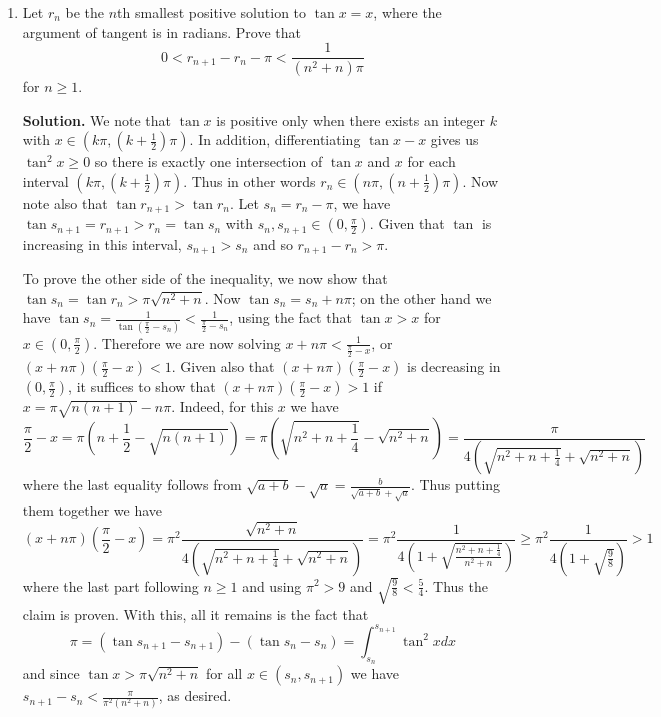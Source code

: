 \documentclass[11pt,a4paper]{article}
\begin{document}
\begin{enumerate}
    	(TODO)
    	
    	\item [B3.] 
    	Let $r_n$ be the $n$th smallest positive solution to $\tan x=x$, where the argument of tangent is in radians. Prove that
    	\[
    	0<r_{n+1}-r_n-\pi<\frac{1}{(n^2+n)\pi}
    	\]for $n\geq 1$.
    	
    	\textbf{Solution.} 
    	We note that $\tan x$ is positive only when there exists an integer $k$ with 
    	$x\in (k\pi, (k + \frac 12)\pi)$. 
    	In addition, differentiating $\tan x - x$ gives us $\tan^2 x\ge 0$ so there is exactly one intersection of 
    	$\tan x$ and $x$ for each interval $(k\pi, (k + \frac 12)\pi)$. 
    	Thus in other words $r_n \in (n\pi, (n + \frac 12)\pi)$. 
    	Now note also that $\tan r_{n+1} > \tan r_n$. 
    	Let $s_n = r_n - \pi$, we have $\tan s_{n+1}= r_{n+1} > r_n = \tan s_n$ 
    	with $s_n, s_{n+1}\in (0, \frac{\pi}{2})$. 
    	Given that $\tan$ is increasing in this interval, 
    	$s_{n+1} > s_n$ and so $r_{n+1}-r_n > \pi$. 
    	
    	To prove the other side of the inequality, we now show that $\tan s_n = \tan r_n > \pi\sqrt{n^2+n}$. 
    	Now $\tan s_n = s_n + n\pi$; 
    	on the other hand we have $\tan s_n = \frac{1}{\tan (\frac{\pi}{2} - s_n)} < \frac{1}{\frac{\pi}{2} - s_n}$, 
    	using the fact that $\tan x > x$ for $x\in (0, \frac{\pi}{2})$. 
    	Therefore we are now solving 
    	$x + n\pi < \frac{1}{\frac{\pi}{2} - x}$, or $(x + n\pi)(\frac{\pi}{2} - x) < 1$. 
    	Given also that $(x + n\pi)(\frac{\pi}{2} - x)$ is decreasing in $(0, \frac{\pi}{2})$, 
    	it suffices to show that $(x + n\pi)(\frac{\pi}{2} - x) > 1$ if $x = \pi\sqrt{n(n+1)} - n\pi$. 
    	Indeed, for this $x$ we have 
    	\[
    	\frac{\pi}{2} - x
    	=\pi (n + \frac 12 - \sqrt{n(n+1)})
    	=\pi (\sqrt{n^2+n + \frac 14} - \sqrt{n^2+n})
    	=\frac{\pi}{4\left(\sqrt{n^2+n + \frac 14} + \sqrt{n^2+n}\right)}
    	\]
    	where the last equality follows from $\sqrt{a+b}-\sqrt{a}=\frac{b}{\sqrt{a+b}+\sqrt{a}}$. 
    	Thus putting them together we have 
    	\[
    	(x + n\pi)(\frac{\pi}{2} - x) 
    	=\pi^2\frac{\sqrt{n^2+n}}{4\left(\sqrt{n^2+n + \frac 14} + \sqrt{n^2+n}\right)}
    	=\pi^2\frac{1}{4(1 + \sqrt{\frac{n^2+n + \frac 14}{n^2+n}})}
    	\ge \pi^2\frac{1}{4(1 + \sqrt{\frac{9}{8}})}
    	> 1
    	\]
    	where the last part following $n\ge 1$ and using $\pi^2 > 9$ and $\sqrt{\frac{9}{8}} < \frac 54$. 
    	Thus the claim is proven. 
    	With this, all it remains is the fact that 
    	\[
    	\pi = (\tan s_{n+1} - s_{n+1}) - (\tan s_n - s_n)
    	=\int_{s_n}^{s_{n+1}} \tan^2 xdx
    	\]
    	and since $\tan x > \pi\sqrt{n^2+n}$ for all $x\in (s_n, s_{n+1})$ we have 
    	$s_{n+1}-s_n < \frac{\pi}{\pi^2(n^2+n)}$, as desired. 
    	

\end{enumerate}
\end{document}
